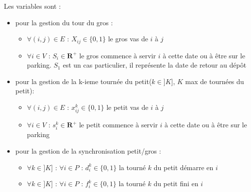 \documentclass[12pt,a4paper,fleqn]{article}
\begin{document}
\clearpage
Les variables sont :
\begin{itemize}
\item pour la gestion du tour du gros :
\begin{itemize}
\item $\forall (i,j) \in E \text{ : } X_{ij} \in \{0,1\}$ le gros vas de $i$ à $j$
\item $\forall i \in V \text{ : } S_i \in \mathbf{R}^+$ le gros commence à servir $i$ à cette date ou à être sur le parking. $S_1$ est un cas particulier, il représente la date de retour au dépôt
\end{itemize}
\item pour la gestion de la k-ieme tournée du petit($k \in ]K]$, $K$ max de tournées du petit):
\begin{itemize}
\item $\forall (i,j) \in E \text{ : } x_{ij}^k \in \{0,1\}$ le petit vas de $i$ à $j$
\item $\forall i \in V \text{ : } s_i^k \in \mathbf{R}^+$ le petit commence à servir $i$ à cette date ou à être sur le parking
\end{itemize}
\item pour la gestion de la synchronisation petit/gros :
\begin{itemize}
\item $\forall k \in ]K] \text{ : } \forall i \in P \text{ : } d^k_i \in \{0,1\}$ la tourné $k$ du petit démarre en $i$ 
\item $\forall k \in ]K] \text{ : } \forall i \in P \text{ : } f^k_i \in \{0,1\}$ la tourné $k$ du petit fini en $i$
\end{itemize}
\end{itemize}
\end{document}
